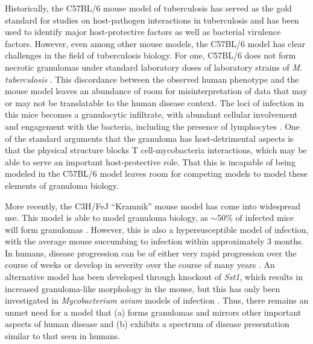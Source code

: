 Historically, the C57BL/6 mouse model of tuberculosis has served as the gold standard for studies on host\hyp{}pathogen interactions in tuberculosis and has been used to identify major host\hyp{}protective factors as well as bacterial virulence factors. However, even among other mouse models, the C57BL/6 model has clear challenges in the field of tuberculosis biology. For one, C57BL/6 does not form necrotic granulomas under standard laboratory doses of laboratory strains of \textit{M. tuberculosis} \citep{Orme1998}. This discordance between the observed human phenotype and the mouse model leaves an abundance of room for misinterpretation of data that may or may not be translatable to the human disease context. The loci of infection in this mice becomes a granulocytic infiltrate, with abundant cellular involvement and engagement with the bacteria, including the presence of lymphocytes \citep{Ulrichs2006, Hunter2007}. One of the standard arguments that the granuloma has host\hyp{}detrimental aspects is that the physical structure blocks T cell\hyp{}mycobacteria interactions, which may be able to serve an important host\hyp{}protective role. That this is incapable of being modeled in the C57BL/6 model leaves room for competing models to model these elements of granuloma biology.

More recently, the C3H/FeJ ``Kramnik'' mouse model has come into widespread use. This model is able to model granuloma biology, as ${\sim}$50\% of infected mice will form granulomas \citep{Harper2012, Lenaerts2015}. However, this is also a hypersusceptible model of infection, with the average mouse succumbing to infection within approximately 3 months. In humans, disease progression can be of either very rapid progression over the course of weeks or develop in severity over the course of many years \citep{Tiemersma2011}. An alternative model has been developed through knockout of \textit{Sst1}, which results in increased granuloma\hyp{}like morphology in the mouse, but this has only been investigated in \textit{Mycobacterium avium} models of infection \citep{Rosenbloom2021}. Thus, there remains an unmet need for a model that (a) forms granulomas and mirrors other important aspects of human disease and (b) exhibits a spectrum of disease presentation similar to that seen in humans. 

